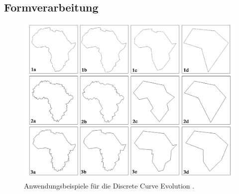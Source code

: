 {    \subsection{Formverarbeitung}
    \begin{figure}[ht]
        \centering
        \includegraphics*[scale = 0.65, keepaspectratio, trim=2 2 2 2 ]{images/DCE/schem_maps_paper_DCE.png}
        \caption[Anwendungsbeispiele für die \glqq Discrete Curve Evolution\grqq{}]{Anwendungsbeispiele für die \glqq Discrete Curve Evolution\grqq{}  \citep{Barkowsky2000}.}
        \label{Bsp_DCE_Bark_Paper}
    \end{figure}


}

